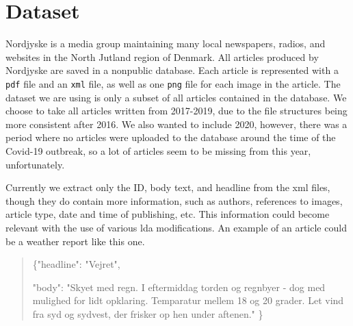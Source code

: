 \section{Dataset}
Nordjyske is a media group maintaining many local newspapers, radios, and websites in the North Jutland region of Denmark.
All articles produced by Nordjyske are saved in a nonpublic database.
Each article is represented with a \texttt{pdf} file and an \texttt{xml} file, as well as one \texttt{png} file for each image in the article.
The dataset we are using is only a subset of all articles contained in the database.
We choose to take all articles written from 2017-2019, due to the file structures being more consistent after 2016.
We also wanted to include 2020, however, there was a period where no articles were uploaded to the database around the time of the Covid-19 outbreak, so a lot of articles seem to be missing from this year, unfortunately.

Currently we extract only the ID, body text, and headline from the xml files, though they do contain more information, such as authors, references to images, article type, date and time of publishing, etc.
This information could become relevant with the use of various \gls{lda} modifications.
An example of an article could be a weather report like this one.
\begin{quote}	
	\{"headline": "Vejret",

	"body": "Skyet med regn. I eftermiddag torden og regnbyer - dog med mulighed for lidt opklaring. Temparatur mellem 18 og 20 grader. Let vind fra syd og sydvest, der frisker op hen under aftenen."
	\}
\end{quote}
